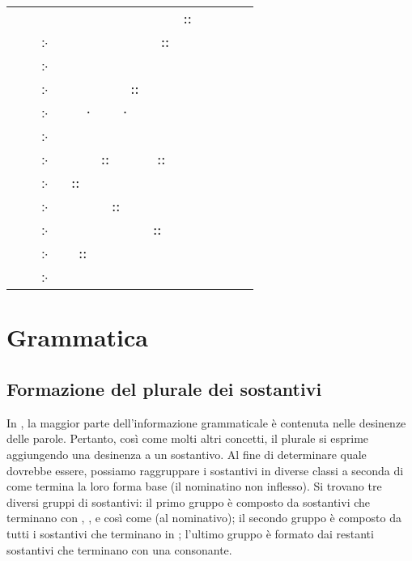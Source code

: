 \section{}
\begin{elvish}
\begin{tabularx}{\textwidth}{r@{ }X}
       &      ⸬   \\
჻ &     ⸬ \\
჻    &   \\
჻ &   ⸬ \\
჻    &  ⸱ ⸱    \\
჻  &   \\
჻ &  ⸬  ⸬    \\
჻  & ⸬ \\
჻ &  ⸬ \\
჻  &    ⸬ \\
჻ & ⸬  \\
჻  & 
\end{tabularx}
\end{elvish}

\section{Grammatica}
\subsection{Formazione del plurale dei sostantivi}
In \quenya, la maggior parte dell'informazione grammaticale è contenuta nelle
desinenze delle parole. Pertanto, così come molti altri concetti, il plurale si
esprime aggiungendo una desinenza a un sostantivo. Al fine di determinare quale
dovrebbe essere, possiamo raggruppare i sostantivi in diverse classi a seconda
di come termina la loro forma base (il nominatino non inflesso).
Si trovano tre diversi gruppi di sostantivi:
il primo gruppo è composto da sostantivi che terminano con , ,
 e  così come  (al nominativo); il secondo gruppo è
composto da tutti i sostantivi che terminano in ; l'ultimo gruppo è
formato dai restanti sostantivi che terminano con una consonante.

